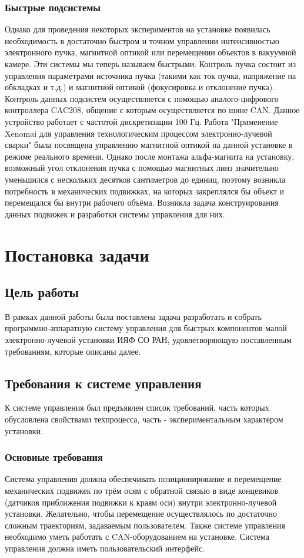 \documentclass[14pt,russian,a4paper]{extarticle}
\begin{document}
\subsubsection{Быстрые подсистемы}
Однако для проведения некоторых экспериментов на установке появилась необходимость в достаточно быстром и точном управлении интенсивностью электронного пучка, магнитной оптикой или перемещении объектов в вакуумной камере. Эти системы мы теперь называем быстрыми.
\newline
Контроль пучка состоит из управления параметрами источника пучка (такими как ток пучка, напряжение на обкладках и т.д.) и магнитной оптикой (фокусировка и отклонение пучка). Контроль данных подсистем осуществляется с помощью аналого-цифрового контроллера CAC208, общение с которым осуществляется по шине CAN. Данное устройство работает с частотой дискретизации 100 Гц.
\newline
Работа "Применение Xenomai для управления технологическим процессом электронно-лучевой сварки" \cite{xeno_weld} была посвящена управлению магнитной оптикой на данной установке в режиме реального времени. Однако после монтажа альфа-магнита на установку, возможный угол отклонения пучка с помощью магнитных линз значительно уменьшился с нескольких десятков сантиметров до единиц, поэтому возникла потребность в механических подвижках, на которых закреплялся бы объект и перемещался бы внутри рабочего объёма. Возникла задача конструирования данных подвижек и разработки системы управления для них.

\section{Постановка задачи}
\subsection{Цель работы}
В рамках данной работы была поставлена задача разработать и собрать программно-аппаратную систему управления для быстрых компонентов малой электронно-лучевой установки ИЯФ СО РАН, удовлетворяющую поставленным требованиям, которые описаны далее.

\subsection{Требования к системе управления}
К системе управления был предъявлен список требований, часть которых обусловлена свойствами техпроцесса, часть - экспериментальным характером установки.
\subsubsection{Основные требования}
Система управления должна обеспечивать позиционирование и перемещение механических подвижек по трём осям с обратной связью в виде концевиков (датчиков приближения подвижки к краям оси) внутри электронно-лучевой установки. Желательно, чтобы перемещение осуществлялось по достаточно сложным траекториям, задаваемым пользователем. Также системе управления необходимо уметь работать с CAN-оборудованием на установке. Система управления должна иметь пользовательский интерфейс.
\end{document}
